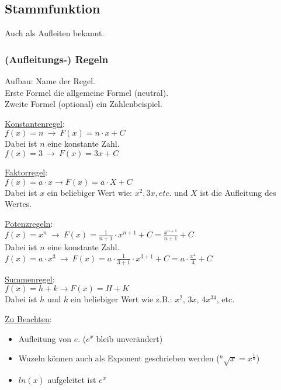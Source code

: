 \subsection{Stammfunktion}
Auch als Aufleiten bekannt.
\subsubsection{(Aufleitungs-) Regeln}
\label{sec:aufleitungs_regeln}
Aufbau: Name der Regel. \\
Erste Formel die allgemeine Formel (neutral). \\
Zweite Formel (optional) ein Zahlenbeispiel. 
\par
\underline{Konstantenregel}: \\
$f(x) = n\ \rightarrow\ F(x) = n\cdot x + C$ \\
Dabei ist $n$ eine konstante Zahl. \\
$f(x) = 3\ \rightarrow\ F(x) = 3x + C$ 
\par
\underline{Faktorregel}: \\
$f(x) = a\cdot x \rightarrow F(x) = a\cdot X + C$ \\
Dabei ist $x$ ein beliebiger Wert wie: $x^2, 3x, etc.$ und $X$ ist die Aufleitung des Wertes. 
\par
\underline{Potenzregeln}: \\
$f(x) = x^n\ \rightarrow\ F(x) = \frac{1}{n + 1}\cdot x^{n + 1} + C = \frac{x^{n+1}}{n+1} + C$\\
Dabei ist $n$ eine konstante Zahl. \\
$f(x) = a\cdot x^3\ \rightarrow\ F(x) = a\cdot \frac{1}{3 + 1}\cdot x^{3 + 1} + C= a\cdot \frac{x^{4}}{4} + C$ 
\par
\underline{Summenregel}: \\
$f(x) = h + k \rightarrow F(x) = H + K$ \\
Dabei ist $h$ und $k$ ein beliebiger Wert wie z.B.: $x^2$, $3x$, $4x^34$, etc. 
\par
\underline{Zu Beachten}:
\begin{itemize}
    \item Aufleitung von $e$. ($e^x$ bleib unverändert)
    \item Wuzeln können auch als Exponent geschrieben werden ($^n\sqrt{x} = x^{\frac{1}{n}}$)
    \item $ln(x)$ aufgeleitet ist $e^x$
\end{itemize}
